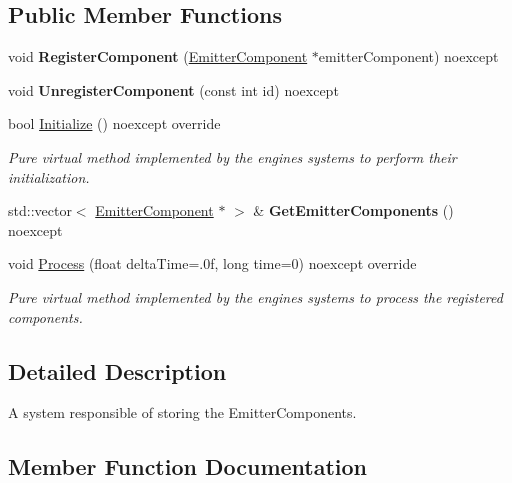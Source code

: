 \subsection*{Public Member Functions}
\begin{DoxyCompactItemize}
\item 
\mbox{\label{class_blade_1_1_particle_system_a6712a38faa5ef51da4182f6a8de2487b}} 
void {\bfseries Register\+Component} (\hyperlink{class_blade_1_1_emitter_component}{Emitter\+Component} $\ast$emitter\+Component) noexcept
\item 
\mbox{\label{class_blade_1_1_particle_system_a6a12bb122a9a34e6596faaf2e6defa11}} 
void {\bfseries Unregister\+Component} (const int id) noexcept
\item 
bool \hyperlink{class_blade_1_1_particle_system_ae409003e325c44d82a3dcd1794ffb77d}{Initialize} () noexcept override
\begin{DoxyCompactList}\small\item\em Pure virtual method implemented by the engine\textquotesingle{}s systems to perform their initialization. \end{DoxyCompactList}\item 
\mbox{\label{class_blade_1_1_particle_system_ae01bdc68155011d373089700cbe88f52}} 
std\+::vector$<$ \hyperlink{class_blade_1_1_emitter_component}{Emitter\+Component} $\ast$ $>$ \& {\bfseries Get\+Emitter\+Components} () noexcept
\item 
void \hyperlink{class_blade_1_1_particle_system_a01e4983673061d797da072324a98d8d4}{Process} (float delta\+Time=.\+0f, long time=0) noexcept override
\begin{DoxyCompactList}\small\item\em Pure virtual method implemented by the engine\textquotesingle{}s systems to process the registered components. \end{DoxyCompactList}\end{DoxyCompactItemize}


\subsection{Detailed Description}
A system responsible of storing the Emitter\+Components. 

\subsection{Member Function Documentation}
\mbox{\label{class_blade_1_1_particle_system_ae409003e325c44d82a3dcd1794ffb77d}} 

